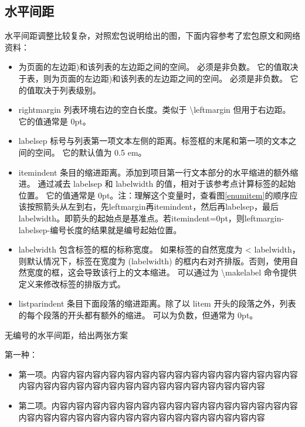 \subsection{水平间距}
水平间距调整比较复杂，对照宏包说明给出的图，下面内容参考了宏包原文和网络资料：
\begin{itemize}[topsep = 0 pt, itemsep= 0 pt, parsep=0pt, partopsep=0pt, leftmargin=36pt, itemindent=0pt, labelsep=6pt, listparindent=24pt]
	\item 为页面的左边距)和该列表的左边距之间的空间。 必须是非负数。 它的值取决于表，则为页面的左边距)和该列表的左边距之间的空间。 必须是非负数。 它的值取决于列表级别。
	\item rightmargin       列表环境右边的空白长度。类似于 \textbackslash{}leftmargin 但用于右边距。 它的值通常是 0pt。
	\item labelsep       标号与列表第一项文本左侧的距离。标签框的末尾和第一项的文本之间的空间。 它的默认值为 0.5 em。
	\item itemindent       条目的缩进距离。添加到项目第一行文本部分的水平缩进的额外缩进。 通过减去 labelsep 和 labelwidth 的值，相对于该参考点计算标签的起始位置。 它的值通常是 0pt。注：理解这个变量时，查看图\ref{enumitem}的顺序应该按照箭头从左到右，先leftmargin再itemindent，然后再labelsep，最后labelwidth。即箭头的起始点是基准点。若itemindent=0pt，则leftmargin-labelsep-编号长度的结果就是编号起始位置。
	\item labelwidth       包含标签的框的标称宽度。 如果标签的自然宽度为 < labelwidth，则默认情况下，标签在宽度为 (labelwidth) 的框内右对齐排版。否则，使用自然宽度的框，这会导致该行上的文本缩进。 可以通过为 \textbackslash{}makelabel 命令提供定义来修改标签的排版方式。
	\item listparindent       条目下面段落的缩进距离。除了以 litem 开头的段落之外，列表的每个段落的开头都有额外的缩进。 可以为负数，但通常为 0pt。
\end{itemize}

无编号的水平间距，给出两张方案
 
第一种：
\begin{itemize}[topsep = 0 pt, itemsep= 0 pt, parsep=0pt, partopsep=0pt, leftmargin=36pt, itemindent=0pt, labelsep=6pt, listparindent=24pt]
	\item 第一项。内容内容内容内容内容内容内容内容内容内容内容内容内容内容内容内容内容内容内容内容内容内容内容内容内容内容内容内容内容内容

	\item 第二项。内容内容内容内容内容内容内容内容内容内容内容内容内容内容内容内容内容内容内容内容内容内容内容内容内容内容内容内容内容内容
	
\end{itemize}


